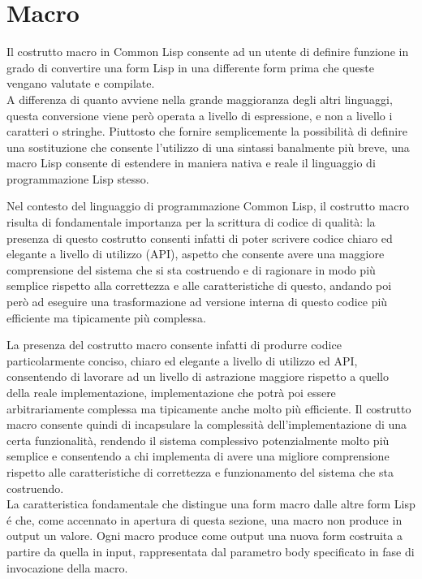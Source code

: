 \section{Macro}

Il costrutto macro in Common Lisp consente ad un utente di definire funzione in
grado di convertire una form Lisp in una differente form prima che queste
vengano valutate e compilate.\\

A differenza di quanto avviene nella grande maggioranza degli altri linguaggi,
questa conversione viene però operata a livello di espressione, e non a livello
i caratteri o stringhe. Piuttosto che fornire semplicemente la possibilità di
definire una sostituzione che consente l’utilizzo di una sintassi banalmente
più breve, una macro Lisp consente di estendere in maniera nativa e reale il
linguaggio di programmazione Lisp stesso.

Nel contesto del linguaggio di programmazione Common Lisp, il costrutto macro
risulta di fondamentale importanza per la scrittura di codice di qualità: la
presenza di questo costrutto consenti infatti di poter scrivere codice chiaro
ed elegante a livello di utilizzo (API), aspetto che consente avere una
maggiore comprensione del sistema che si sta costruendo e di ragionare in modo
più semplice rispetto alla correttezza e alle caratteristiche di questo,
andando poi però ad eseguire una trasformazione ad versione interna di questo
codice più efficiente ma tipicamente più complessa.

La presenza del costrutto macro consente infatti di produrre codice
particolarmente conciso, chiaro ed elegante a livello di utilizzo ed API,
consentendo di lavorare ad un livello di astrazione maggiore rispetto a quello
della reale implementazione, implementazione che potrà poi essere
arbitrariamente complessa ma tipicamente anche molto più efficiente. Il
costrutto macro consente quindi di incapsulare la complessità
dell’implementazione di una certa funzionalità, rendendo il sistema complessivo
potenzialmente molto più semplice e consentendo a chi implementa di avere una
migliore comprensione rispetto alle caratteristiche di correttezza e
funzionamento del sistema che sta costruendo.\\

La caratteristica fondamentale che distingue una form macro dalle altre form
Lisp é che, come accennato in apertura di questa sezione, una macro non produce
in output un valore. Ogni macro produce come output una nuova form costruita a
partire da quella in input, rappresentata dal parametro body specificato in
fase di invocazione della macro.

